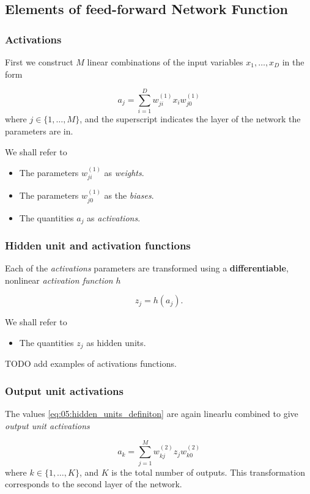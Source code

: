 \subsection{Elements of feed-forward Network Function}
\begin{frame}
  \frametitle{Activations}

  First we construct $M$ linear combinations of the input
  variables $x_1, \ldots, x_D$ in the form

  \begin{equation}
    a_j 
    = 
    \sum_{i = 1}^D
    w_{j i}^{(1)} x_i
    w_{j 0}^{(1)}
  \end{equation}
  where $j \in \{1, \ldots, M\}$, and the superscript indicates the layer of the network the parameters are in.
  
  We shall refer to 
  \begin{itemize}
    \item The parameters $w_{j i}^{(1)}$ as \textit{weights}.
    \item The parameters $w_{j 0}^{(1)}$ as the \textit{biases}. 
    \item The quantities $a_j$ as \textit{activations}. 
  \end{itemize}
\end{frame}
\begin{frame}
  \frametitle{Hidden unit and activation functions }

  Each of the \textit{activations} parameters are transformed 
  using a \textbf{differentiable}, nonlinear 
  \textit{activation function} $h$

  \begin{equation}\label{eq:05:hidden_units_definiton}
    z_j = h(a_j). 
  \end{equation}

  We shall refer to 
  \begin{itemize}
    \item The quantities $z_j$ as hidden units. 
  \end{itemize}
TODO add examples of activations functions. 
\end{frame}

\begin{frame}
  \frametitle{Output unit activations}

  The values \ref{eq:05:hidden_units_definiton}
are again linearlu combined to give 
\textit{output unit activations}

\begin{equation} \label{eq:05:definition_output}
  a_k 
  = 
  \sum_{j = 1}^M 
  w_{k j}^{(2)} z_j
  w_{k 0}^{(2)}
\end{equation}
where $k \in \{1, \ldots, K\}$, and $K$ is the total number of outputs.
This transformation corresponds to the second layer of the network. 
\end{frame}


